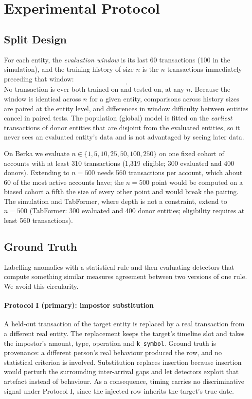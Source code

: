\section{Experimental Protocol}\label{sec:protocol}

\subsection{Split Design}
For each entity, the \emph{evaluation window} is its last 60 transactions (100 in the simulation), and the training history of size $n$ is the $n$ transactions immediately preceding that window:
\begin{equation*}
[\;\text{earlier history}\;\mid\;\underbrace{n\ \text{training}}_{\text{varies}}\;\mid\;\underbrace{60\ \text{evaluation}}_{\text{fixed}}\;].
\end{equation*}
No transaction is ever both trained on and tested on, at any $n$. Because the window is identical across $n$ for a given entity, comparisons across history sizes are paired at the entity level, and differences in window difficulty between entities cancel in paired tests. The population (global) model is fitted on the \emph{earliest} transactions of donor entities that are disjoint from the evaluated entities, so it never sees an evaluated entity's data and is not advantaged by seeing later data.

On Berka we evaluate $n\in\{1,5,10,25,50,100,250\}$ on one fixed cohort of accounts with at least 310 transactions (1{,}319 eligible; 300 evaluated and 400 donors). Extending to $n=500$ needs 560 transactions per account, which about 60 of the most active accounts have; the $n=500$ point would be computed on a biased cohort a fifth the size of every other point and would break the pairing. The simulation and TabFormer, where depth is not a constraint, extend to $n=500$ (TabFormer: 300 evaluated and 400 donor entities; eligibility requires at least 560 transactions).

\subsection{Ground Truth}
Labelling anomalies with a statistical rule and then evaluating detectors that compute something similar measures agreement between two versions of one rule. We avoid this circularity.

\paragraph{Protocol I (primary): impostor substitution}
A held-out transaction of the target entity is replaced by a real transaction from a different real entity. The replacement keeps the target's timeline slot and takes the impostor's amount, type, operation and \texttt{k\_symbol}. Ground truth is provenance: a different person's real behaviour produced the row, and no statistical criterion is involved. Substitution replaces insertion because insertion would perturb the surrounding inter-arrival gaps and let detectors exploit that artefact instead of behaviour. As a consequence, timing carries no discriminative signal under Protocol I, since the injected row inherits the target's true date.

